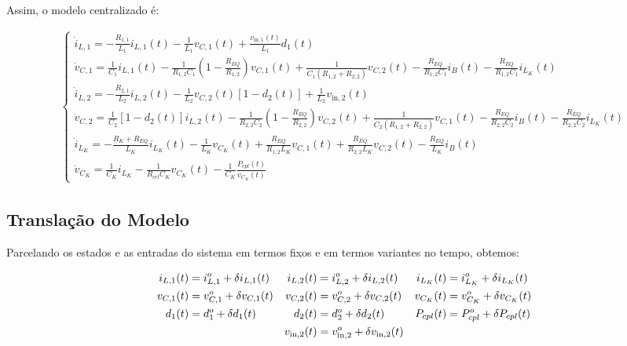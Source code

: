 \documentclass{article}
\newcommand{\nle}{%
  \notag \\[0pt]
}
\begin{document}
Assim, o modelo centralizado é:

\begin{gather}
  \begin{cases}
    \dot{i}_{L,1} = - \frac{R_{1,1}}{L_1} i_{L,1}(t) - \frac{1}{L_1} v_{C,1}(t) + \frac{v_{\text{in}, 1}(t)}{L_1} d_1(t)                                                                                                                        \\[12pt]
    \dot{v}_{C,1} = \frac{1}{C_1} i_{L,1}(t) - \frac{1}{R_{1,2}C_1} \left(1  - \frac{R_{EQ}}{R_{1,2}}\right) v_{C,1}(t) +\frac{1}{C_1 (R_{1,2} + R_{2,2})} v_{C,2}(t) - \frac{R_{EQ}}{R_{1,2}C_1} i_B(t) - \frac{R_{EQ}}{R_{1,2}C_1} i_{L_K}(t) \\[12pt]
    \dot{i}_{L,2} = - \frac{R_{2,1}}{L_2} i_{L,2}(t) - \frac{1}{L_2} v_{C,2}(t) \left[1 - d_2(t)\right] + \frac{1}{L_2} v_{\text{in}, 2}(t)                                                                                                     \\[12pt]
    \dot{v}_{C,2} = \frac{1}{C_2} \left[1 - d_2(t)\right] i_{L,2}(t)
    - \frac{1}{R_{2,2} C_2} \left(1 - \frac{R_{EQ}}{R_{2,2}}\right) v_{C,2}(t)
    + \frac{1}{C_2 (R_{1,2} + R_{2,2})} v_{C,1}(t)
    - \frac{R_{EQ}}{R_{2,2}C_2} i_B(t) - \frac{R_{EQ}}{R_{2,2}C_2} i_{L_K}(t)                                                                                                                                                              \\[12pt]
    \dot{i}_{L_K} = - \frac{R_K + R_{EQ}}{L_K} i_{L_K}(t) - \frac{1}{L_K} v_{C_K}(t) + \frac{R_{EQ}}{R_{1,2} L_K} v_{C,1}(t) + \frac{R_{EQ}}{R_{2,2} L_K} v_{C,2}(t) - \frac{R_{EQ}}{L_K} i_B(t)                                                \\[12pt]
    \dot{v}_{C_K} = \frac{1}{C_K} i_{L_K} - \frac{1}{R_{crl} C_K} v_{C_K}(t) - \frac{1}{C_K} \frac{P_{cpl}(t)}{v_{C_K}(t)}
  \end{cases}
\end{gather}


\subsection*{Translação do Modelo}

Parcelando os estados e as entradas do sistema em termos fixos e em termos variantes no tempo, obtemos:

\begin{align}
  i_{L,1}(t) & = i_{L,1}^o + \delta i_{L,1}(t) & i_{L,2}(t) & = i_{L,2}^o + \delta i_{L,2}(t) & i_{L_K}(t) & = i_{L_K}^o + \delta i_{L_K}(t) \nle
  v_{C,1}(t) & = v_{C,1}^o + \delta v_{C,1}(t) & v_{C,2}(t) & = v_{C,2}^o + \delta v_{C,2}(t) & v_{C_K}(t) & = v_{C_K}^o + \delta v_{C_K}(t) \nle
  d_1(t)     & = d_1^o + \delta d_1(t)         & d_2(t)     & = d_2^o + \delta d_2(t)         & P_{cpl}(t) & = P_{cpl}^o + \delta P_{cpl}(t) \nle
             &                                 & v_{\text{in},2}(t)     & = v_{\text{in},2}^o + \delta v_{\text{in},2}(t)         &            &
\end{align}
\end{document}
